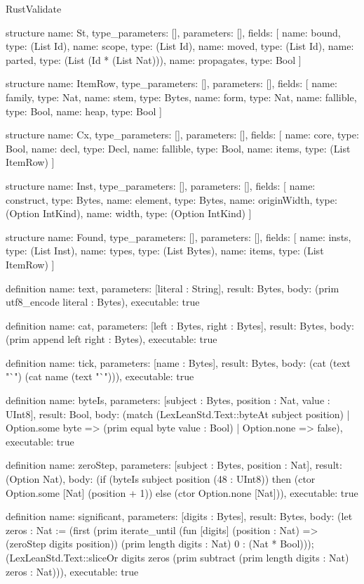 \begin{lexlean}{RustValidate}
\begin{semanticmodule}
structure{
  name: St,
  type_parameters: [],
  parameters: [],
  fields: [
    {name: bound, type: (List Id)},
    {name: scope, type: (List Id)},
    {name: moved, type: (List Id)},
    {name: parted, type: (List (Id * (List Nat)))},
    {name: propagates, type: Bool}
  ]
}

structure{
  name: ItemRow,
  type_parameters: [],
  parameters: [],
  fields: [
    {name: family, type: Nat},
    {name: stem, type: Bytes},
    {name: form, type: Nat},
    {name: fallible, type: Bool},
    {name: heap, type: Bool}
  ]
}

structure{
  name: Cx,
  type_parameters: [],
  parameters: [],
  fields: [
    {name: core, type: Bool},
    {name: decl, type: Decl},
    {name: fallible, type: Bool},
    {name: items, type: (List ItemRow)}
  ]
}

structure{
  name: Inst,
  type_parameters: [],
  parameters: [],
  fields: [
    {name: construct, type: Bytes},
    {name: element, type: Bytes},
    {name: originWidth, type: (Option IntKind)},
    {name: width, type: (Option IntKind)}
  ]
}

structure{
  name: Found,
  type_parameters: [],
  parameters: [],
  fields: [
    {name: insts, type: (List Inst)},
    {name: types, type: (List Bytes)},
    {name: items, type: (List ItemRow)}
  ]
}

definition{
  name: text,
  parameters: [literal : String],
  result: Bytes,
  body: (prim utf8_encode literal : Bytes),
  executable: true
}

definition{
  name: cat,
  parameters: [left : Bytes, right : Bytes],
  result: Bytes,
  body: (prim append left right : Bytes),
  executable: true
}

definition{
  name: tick,
  parameters: [name : Bytes],
  result: Bytes,
  body: (cat (text "`") (cat name (text "`"))),
  executable: true
}

definition{
  name: byteIs,
  parameters: [subject : Bytes, position : Nat, value : UInt8],
  result: Bool,
  body: (match (LexLeanStd.Text::byteAt subject position)
    | Option.some byte => (prim equal byte value : Bool)
    | Option.none => false),
  executable: true
}

definition{
  name: zeroStep,
  parameters: [subject : Bytes, position : Nat],
  result: (Option Nat),
  body: (if (byteIs subject position (48 : UInt8)) then (ctor Option.some [Nat] (position + 1)) else (ctor Option.none [Nat])),
  executable: true
}

definition{
  name: significant,
  parameters: [digits : Bytes],
  result: Bytes,
  body: (let zeros : Nat := (first (prim iterate_until (fun [digits] (position : Nat) => (zeroStep digits position)) (prim length digits : Nat) 0 : (Nat * Bool))); (LexLeanStd.Text::sliceOr digits zeros (prim subtract (prim length digits : Nat) zeros : Nat))),
  executable: true
}


\end{semanticmodule}
\end{lexlean}

